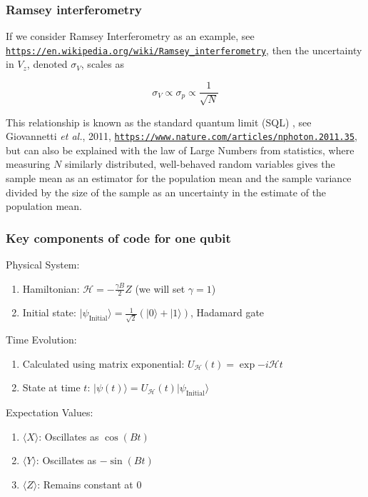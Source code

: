 \documentclass{beamer}
\begin{document}
\begin{frame}
\frametitle{Ramsey interferometry}

If we consider Ramsey Interferometry as an example, see \href{{https://en.wikipedia.org/wiki/Ramsey_interferometry}}{\nolinkurl{https://en.wikipedia.org/wiki/Ramsey_interferometry}}, then the
uncertainty in $V_z$, denoted $\sigma_{V}$,
scales as

\[
\sigma_{V} \propto \sigma_{p} \propto \frac{1}{\sqrt{N}}
\]

This relationship is known as the standard quantum limit (SQL)
, see Giovannetti \emph{et al.}, 2011, \href{{https://www.nature.com/articles/nphoton.2011.35}}{\nolinkurl{https://www.nature.com/articles/nphoton.2011.35}},
but can also be explained with the law of
Large Numbers from statistics, where measuring $N$ similarly
distributed, well-behaved random variables gives the sample mean as an
estimator for the population mean and the sample variance divided by
the size of the sample as an uncertainty in the estimate of the
population mean.
\end{frame}

\begin{frame}
\frametitle{Key components of code for one qubit}

\begin{block}{Physical System: }
\begin{enumerate}
\item Hamiltonian: $\mathcal{H} = -\frac{\gamma B}{2}Z$ (we will set $\gamma=1$)

\item Initial state: $\vert \psi_{\mathrm{Initial}}\rangle = \frac{1}{\sqrt{2}}(|0\rangle + |1\rangle)$, Hadamard gate
\end{enumerate}

\noindent
\end{block}

\begin{block}{Time Evolution: }
\begin{enumerate}
\item Calculated using matrix exponential: $U_{\mathcal{H}}(t) = \exp{-i\mathcal{H}t}$

\item State at time $t$: $\vert \psi(t)\rangle = U_{\mathcal{H}}(t)\vert\psi_{\mathrm{Initial}} \rangle$
\end{enumerate}

\noindent
\end{block}

\begin{block}{Expectation Values: }
\begin{enumerate}
\item $\langle X\rangle$: Oscillates as $\cos(Bt)$

\item $\langle Y\rangle$: Oscillates as $-\sin(Bt)$

\item $\langle Z\rangle$: Remains constant at $0$
\end{enumerate}

\noindent
\end{block}
\end{frame}
\end{document}
